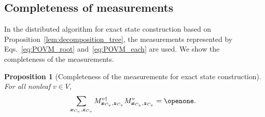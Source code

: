 \documentclass[preprintnumbers,aps,amsmath,amssymb,pra,twocolumn,showpacs,superscriptaddress,floatfix]{revtex4-1}
\theoremstyle{plain}
\newtheorem{proposition}[theorem]{Proposition}
\theoremstyle{definition}
\theoremstyle{remark}
\begin{document}
\subsection{Completeness of measurements}
    In the distributed algorithm for exact state construction based on Proposition~\ref{lem:decomposition_tree}, the measurements represented by Eqs.~\eqref{eq:POVM_root} and~\eqref{eq:POVM_each} are used.
    We show the completeness of the measurements.
    \begin{proposition}[Completeness of the measurements for exact state construction]
        For all nonleaf $v\in V$,
\begin{equation*}
            \sum_{\boldsymbol{x}_{C_v},\boldsymbol{z}_{C_v}}M^{v\dag}_{\boldsymbol{x}_{C_v},\boldsymbol{z}_{C_v}} M^{v}_{\boldsymbol{x}_{C_v},\boldsymbol{z}_{C_v}}=\textup{\openone}.
\end{equation*}
\end{proposition}
\end{document}
